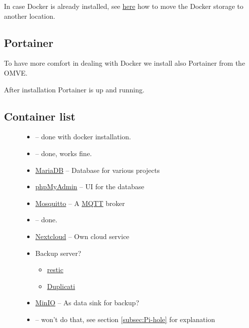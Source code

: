 In case \gls{Docker} is already installed, see \href{https://www.reddit.com/r/OpenMediaVault/comments/fl40gf/moving_docker_storage/}{here}
how to move the \gls{Docker} storage to another location.

\subsection{Portainer}

To have more comfort in dealing with \gls{Docker} we install also \gls{Portainer}
from the \gls{OMVE}.


After installation \gls{Portainer} is up and running.


\subsection{Container list}

\begin{figure}[H]
    \begin{itemize}
        \item {} --
              done with docker installation.
        \item {} --
              done, works fine.
        \item \href{https://mariadb.org/}{MariaDB} -- Database for various projects
        \item \href{https://www.phpmyadmin.net/}{phpMyAdmin} -- UI for the database
        \item \href{https://mosquitto.org/}{Mosquitto} -- A \href{https://mqtt.org/}{MQTT} broker
        \item {} --
              done.
        \item \href{https://nextcloud.com/}{Nextcloud} -- Own cloud service
        \item Backup server?
              \begin{itemize}
                  \item \href{https://restic.net/}{restic}
                  \item \href{https://www.duplicati.com/}{Duplicati}
              \end{itemize}
        \item \href{https://docs.min.io/}{MinIO} -- As data sink for backup?
        \item {} --
              won't do that, see section \ref{subsec:Pi-hole} for explanation
    \end{itemize}
\end{figure}

